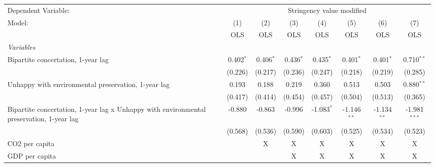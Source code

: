 
\begingroup
\centering
\begin{tabular}{lccccccc}
   \toprule
   Dependent Variable: & \multicolumn{7}{c}{Stringency value modified}\\
   Model:                                                                                   & (1)         & (2)         & (3)         & (4)          & (5)           & (6)           & (7)\\  
                                                                                            &  OLS        & OLS         & OLS         & OLS          & OLS           & OLS           & OLS\\  
   \midrule
   \emph{Variables}\\
   Bipartite concertation, 1-year lag                                                       & 0.402$^{*}$ & 0.406$^{*}$ & 0.436$^{*}$ & 0.435$^{*}$  & 0.401$^{*}$   & 0.401$^{*}$   & 0.710$^{**}$\\   
                                                                                            & (0.226)     & (0.217)     & (0.236)     & (0.247)      & (0.218)       & (0.219)       & (0.285)\\   
   Unhappy with environmental preservation, 1-year lag                                      & 0.193       & 0.188       & 0.219       & 0.360        & 0.513         & 0.503         & 0.880$^{**}$\\   
                                                                                            & (0.417)     & (0.414)     & (0.454)     & (0.457)      & (0.504)       & (0.513)       & (0.365)\\   
   Bipartite concertation, 1-year lag x Unhappy with environmental preservation, 1-year lag & -0.880      & -0.863      & -0.996      & -1.083$^{*}$ & -1.146$^{**}$ & -1.134$^{**}$ & -1.981$^{***}$\\   
                                                                                            & (0.568)     & (0.536)     & (0.590)     & (0.603)      & (0.525)       & (0.534)       & (0.523)\\   
   CO2 per capita                                                                           &             & X           & X           & X            & X             & X             & X\\  
   GDP per capita                                                                           &             &             & X           & X            & X             & X             & X\\  

\end{tabular}
